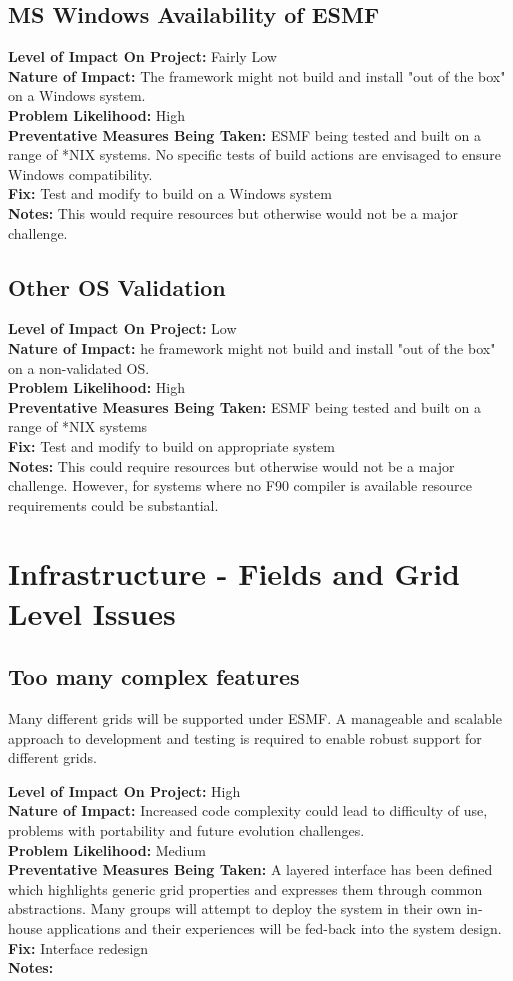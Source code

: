 \documentclass[english]{article}
\newcommand{\req}[1]{\section{\hspace{.2in}#1}}
\newcommand{\sreq}[1]{\subsection{\hspace{.2in}#1}}
\newenvironment
{reqlist}
{\begin{list} {} {} \rm \item[]}
{\end{list}}
\begin{document}
\sreq{MS Windows Availability of ESMF}
\begin{reqlist}
{\bf Level of Impact On Project:} Fairly Low \\
{\bf Nature of Impact:} The framework might not build and install "out of the box"
on a Windows system.\\
{\bf Problem Likelihood:} High \\
{\bf Preventative Measures Being Taken:}  ESMF being tested and built on a range of *NIX systems.
No specific tests of build actions are envisaged to ensure Windows compatibility.\\
{\bf Fix:} Test and modify to build on a Windows system\\
{\bf Notes:} This would require resources but otherwise would not be a major challenge.
\end{reqlist}

\sreq{Other OS Validation}
\begin{reqlist}
{\bf Level of Impact On Project:} Low \\
{\bf Nature of Impact:} he framework might not build and install "out of the box"
on a non-validated OS.\\
{\bf Problem Likelihood:} High \\
{\bf Preventative Measures Being Taken:} ESMF being tested and built on a range of *NIX systems\\
{\bf Fix:}  Test and modify to build on appropriate system\\
{\bf Notes:} This could require resources but otherwise would not be a major challenge.
However, for systems where no F90 compiler is available resource requirements could be substantial.
\end{reqlist}

\req{Infrastructure - Fields and Grid Level Issues}
\sreq{Too many complex features}
Many different grids will be supported under ESMF. A manageable and scalable approach
to development and testing is required to enable robust support for different grids.
\begin{reqlist}
{\bf Level of Impact On Project:} High \\
{\bf Nature of Impact:} Increased code complexity could lead to
difficulty of use, problems with portability and future evolution challenges.\\
{\bf Problem Likelihood:} Medium \\
{\bf Preventative Measures Being Taken:} A layered interface has been defined 
which highlights generic grid properties and expresses them through common abstractions.
Many groups will attempt to deploy the system in their own in-house
applications and their experiences will be fed-back into the system design.\\
{\bf Fix:} Interface redesign \\
{\bf Notes:} 
\end{reqlist}
\end{document}
